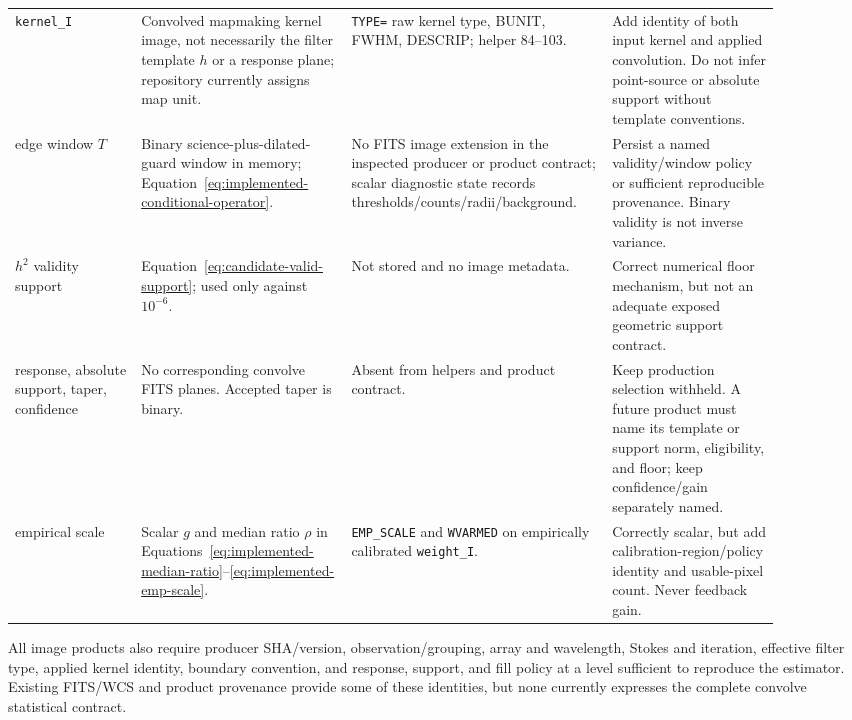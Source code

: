 \documentclass[11pt]{article}
\newcommand{\code}[1]{\nolinkurl{#1}}
\begin{document}
\begin{longtable}{L{0.15\linewidth}L{0.25\linewidth}L{0.29\linewidth}L{0.20\linewidth}}
\code{kernel_I} & Convolved mapmaking kernel image, not necessarily the filter template $h$ or a response plane; repository currently assigns map unit. & \code{TYPE=} raw kernel type, BUNIT, FWHM, DESCRIP; helper 84--103. & Add identity of both input kernel and applied convolution.  Do not infer point-source or absolute support without template conventions.\\
edge window $T$ & Binary science-plus-dilated-guard window in memory; Equation~\eqref{eq:implemented-conditional-operator}. & No FITS image extension in the inspected producer or product contract; scalar diagnostic state records thresholds/counts/radii/background. & Persist a named validity/window policy or sufficient reproducible provenance.  Binary validity is not inverse variance.\\
$h^2$ validity support & Equation~\eqref{eq:candidate-valid-support}; used only against $10^{-6}$. & Not stored and no image metadata. & Correct numerical floor mechanism, but not an adequate exposed geometric support contract.\\
response, absolute support, taper, confidence & No corresponding convolve FITS planes.  Accepted taper is binary. & Absent from helpers and product contract. & Keep production selection withheld.  A future product must name its template or support norm, eligibility, and floor; keep confidence/gain separately named.\\
empirical scale & Scalar $g$ and median ratio $\rho$ in Equations~\eqref{eq:implemented-median-ratio}--\eqref{eq:implemented-emp-scale}. & \code{EMP_SCALE} and \code{WVARMED} on empirically calibrated \code{weight_I}. & Correctly scalar, but add calibration-region/policy identity and usable-pixel count.  Never feedback gain.\\
\bottomrule
\end{longtable}
\normalsize

All image products also require producer SHA/version, observation/grouping,
array and wavelength, Stokes and iteration, effective filter type, applied
kernel identity, boundary convention, and response, support, and fill policy at a level
sufficient to reproduce the estimator.  Existing FITS/WCS and product
provenance provide some of these identities, but none currently expresses the
complete convolve statistical contract.
\end{document}
